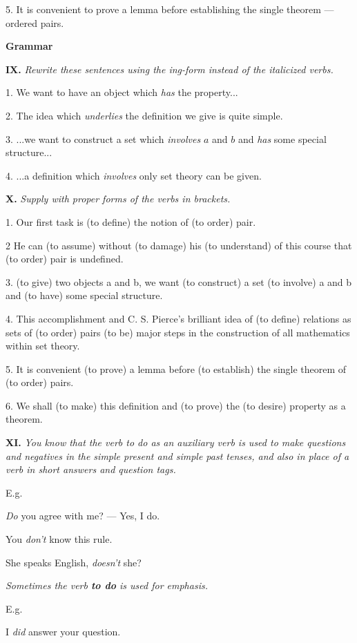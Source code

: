\documentclass[a4paper]{article}
\newcommand{\ESect}[1]{\medskip\par{\large \textbf{#1}}\par}
\newcommand{\ETask}[2]{\medskip\par\textbf{#1.} \textit{#2}\par}
\begin{document}
5. It is convenient to prove a lemma before establishing the single theorem --- ordered pairs.

\ESect{Grammar}

\ETask{IX}{Rewrite these sentences using the ing-form instead of the italicized verbs.}

1. We want to have an object which \textit{has} the property...

2. The idea which \textit{underlies} the definition we give is quite simple.

3. ...we want to construct a set which \textit{involves} $a$ and $b$ and \textit{has} some special structure...

4. ...a definition which \textit{involves} only set theory can be given.

\ETask{X}{Supply with proper forms of the verbs in brackets.}

1. Our first task is (to define) the notion of (to order) pair.

2 He can (to assume) without (to damage) his (to understand) of this course that (to order) pair is undefined.

3. (to give) two objects a and b, we want (to construct) a set (to involve) a and b and (to have) some special structure.

4. This accomplishment and C. S. Pierce's brilliant idea of (to define) relations as sets of (to order)
pairs (to be) major steps in the construction of all mathematics within set theory.

5. It is convenient (to prove) a lemma before (to establish) the single theorem of (to order) pairs.

6. We shall (to make) this definition and (to prove) the (to desire) property as a theorem.

\ETask{XI}{You know that the verb to do as an auxiliary verb is used to make questions and negatives in the simple present and simple
past tenses, and also in place of a verb in short answers and question tags.}

E.g.

\textit{Do} you agree with me? --- Yes, I do.

You \textit{don't} know this rule.

She speaks English, \textit{doesn't} she?

\textit{Sometimes the verb \textbf{to do} is used for emphasis.}

E.g.

I \textit{did} answer your question.
\end{document}
